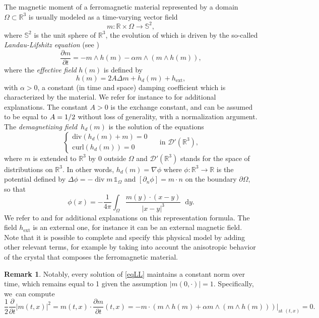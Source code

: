 \documentclass[10pt]{amsart}
\theoremstyle{definition}
\newtheorem{remark}[theorem]{Remark}
\newcommand{\R} {\mathbb{R}}
\newcommand*\diff{\mathop{}\!\mathrm{d}}
\begin{document}
The magnetic moment of a ferromagnetic material represented by a domain $\Omega\subset\R^3$ is usually modeled as a time-varying vector field
\[
m:\R\times\Omega\to\mathbb{S}^2,
\]
where $\mathbb{S}^2$ is the unit sphere of $\R^3$, the evolution of which is driven by the so-called \emph{Landau-Lifshitz equation} (see \cite{landau2013electrodynamics})
\begin{equation}\label{eqLL}
\frac{\partial m}{\partial t}=-m\wedge h(m)-\alpha m\wedge (m\wedge h(m)),
\end{equation}
where the \emph{effective field} $h(m)$ is defined by
\[
h(m) = 2A\Delta m+h_d(m)+h_{\mathrm{ext}},
\]
with $\alpha>0$, a constant (in time and space) damping coefficient which is characterized by the material. We refer for instance to \cite{hubert2008magnetic,brown1963micromagnetics} for additional explanations.
The constant $A>0$ is the exchange constant, and can be assumed to be equal to $A=\nobreak1/2$ without loss of generality, with a normalization argument. The \textit{demagnetizing field}~$h_d(m)$ is the solution of the equations
\[
\begin{cases}
\mathrm{div}(h_d(m)+m)=0\\
\mathrm{curl}(h_d(m))=0
\end{cases}
\quad \text{ in }\mathcal{D}'(\R^3),
\]
where $m$ is extended to $\R^3$ by $0$ outside $\Omega$ and $\mathcal{D}'(\R^3)$ stands for the space of distributions on $\R^3$. In other words, $h_d(m) =\nabla \phi$ where $\phi: \R^3 \to \R$ is the potential defined by $\Delta \phi = -\operatorname{div} m \, \mathds{1}_{\Omega}$ and $[\partial_n\phi]=m\cdot n $ on the boundary $\partial\Omega$, so that
\[
\phi(x)=-\frac{1}{4\pi}\int_\Omega \frac{m(y)\cdot (x-y)}{|x-y|^3} \diff y.
\]
We refer to \cite{alouges2001computation,brown1963micromagnetics} and \cite[\S 1]{di2020variational} for additional explanations on this representation formula.
The field $h_{\mathrm{ext}}$ is an external one, for instance it can be an external magnetic field.
Note that it is possible to complete and specify this physical model by adding other relevant terms, for example by taking into account the anisotropic behavior of the crystal that composes the ferromagnetic material.

\begin{remark}
Notably, every solution of \eqref{eqLL} maintains a constant norm over time, which remains equal to 1 given the assumption $|m(0,\cdot)|=1$. Specifically, we~can compute
\[
\frac12\frac{\partial}{\partial t}|m(t,x)|^2\!=\!m(t,x)\cdot \frac{\partial m}{\partial t}(t,x)\!=\!\left.-m\cdot (m\wedge h(m)+\alpha m\wedge (m\wedge h(m)))\right|_{\text{at }(t,x)}=0.
\]
\end{remark}
\end{document}
